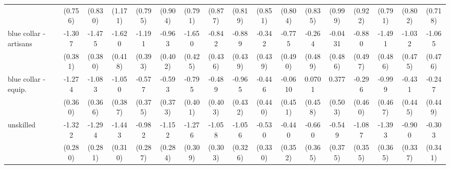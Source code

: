 {\begin{tabular}{l*{16}{c}}
                    &     (0.756)         &     (0.830)         &     (1.171)         &     (0.795)         &     (0.904)         &     (0.791)         &     (0.877)         &     (0.819)         &     (0.851)         &     (0.804)         &     (0.835)         &     (0.999)         &     (0.922)         &     (0.791)         &     (0.802)         &     (0.718)         \\
[1em]
blue collar - artisans&      -1.307\sym{***}&      -1.475\sym{***}&      -1.620\sym{***}&      -1.191\sym{**} &      -0.963\sym{*}  &      -1.650\sym{***}&      -0.842         &      -0.889\sym{*}  &      -0.342         &      -0.775         &      -0.264         &     -0.0431         &      -0.880         &      -1.491\sym{**} &      -1.032\sym{*}  &      -1.065\sym{*}  \\
                    &     (0.381)         &     (0.380)         &     (0.418)         &     (0.393)         &     (0.402)         &     (0.425)         &     (0.436)         &     (0.439)         &     (0.439)         &     (0.490)         &     (0.489)         &     (0.486)         &     (0.497)         &     (0.486)         &     (0.475)         &     (0.476)         \\
[1em]
blue collar - equip.&      -1.274\sym{***}&      -1.083\sym{**} &      -1.050\sym{**} &      -0.577         &      -0.593         &      -0.795\sym{*}  &      -0.489         &      -0.965\sym{*}  &      -0.446         &     -0.0610         &      0.0701         &       0.377         &      -0.296         &      -0.999\sym{*}  &      -0.431         &      -0.247         \\
                    &     (0.360)         &     (0.366)         &     (0.387)         &     (0.375)         &     (0.373)         &     (0.401)         &     (0.403)         &     (0.432)         &     (0.440)         &     (0.451)         &     (0.458)         &     (0.503)         &     (0.460)         &     (0.467)         &     (0.445)         &     (0.449)         \\
[1em]
unskilled           &      -1.322\sym{***}&      -1.294\sym{***}&      -1.443\sym{***}&      -0.982\sym{***}&      -1.152\sym{***}&      -1.276\sym{***}&      -1.058\sym{***}&      -1.056\sym{**} &      -0.530         &      -0.440         &      -0.660         &      -0.549         &      -1.087\sym{**} &      -1.393\sym{***}&      -0.900\sym{**} &      -0.303         \\
                    &     (0.280)         &     (0.281)         &     (0.310)         &     (0.287)         &     (0.284)         &     (0.309)         &     (0.303)         &     (0.326)         &     (0.330)         &     (0.352)         &     (0.365)         &     (0.375)         &     (0.355)         &     (0.365)         &     (0.337)         &     (0.341)         \\

\end{tabular}}
